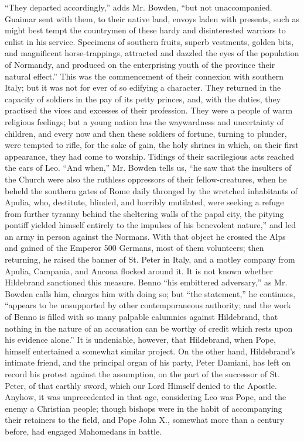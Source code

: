 ``They departed accordingly,'' adds Mr. Bowden, ``but
not unaccompanied. Guaimar sent with them, to their native land,
envoys laden with presents, such as might best tempt the countrymen of
these hardy and disinterested warriors to enlist in his service.
Specimens of southern fruits, superb vestments, golden bits, and
magnificent horse-trappings, attracted and dazzled the eyes of the
population of Normandy, and produced on the enterprising youth of the
province their natural effect.'' This was the commencement of their
connexion with southern Italy; but it was not for ever of so edifying
a character. They returned in the capacity of soldiers in the
pay of its petty princes, and, with the duties, they practised the
vices and excesses of their profession. They were a people of warm
religious feelings; but a young nation has the waywardness and
uncertainty of children, and every now and then these soldiers of
fortune, turning to plunder, were tempted to rifle, for the sake of
gain, the holy shrines in which, on their first appearance, they had
come to worship. Tidings of their sacrilegious acts reached the ears
of Leo. ``And when,'' Mr. Bowden tells us, ``he saw that the insulters of
the Church were also the ruthless oppressors of their
fellow-creatures, when he beheld the southern gates of Rome daily
thronged by the wretched inhabitants of Apulia, who, destitute,
blinded, and horribly mutilated, were seeking a refuge from further
tyranny behind the sheltering walls of the papal city, the pitying
pontiff yielded himself entirely to the impulses of his benevolent
nature,'' and led an army in person against the Normans. With that
object he crossed the Alps and gained of the Emperor 500 Germans, most
of them volunteers; then returning, he raised the banner of St. Peter
in Italy, and a motley company from Apulia, Campania, and Ancona
flocked around it. It is not known whether Hildebrand sanctioned this
measure. Benno ``his embittered adversary,'' as Mr. Bowden calls him,
charges him with doing so; but ``the statement,'' he continues, ``appears
to be unsupported by other contemporaneous authority; and the work of
Benno is filled with so many palpable calumnies against Hildebrand,
that nothing in the nature of an accusation can be worthy of credit
which rests upon his evidence alone.'' It is undeniable, however, that
Hildebrand, when Pope, himself entertained a somewhat similar project.
On the other hand, Hildebrand's intimate friend, and the
principal organ of his party, Peter Damiani, has left on record his
protest against the assumption, on the part of the successor of St.
Peter, of that earthly sword, which our Lord Himself denied to the
Apostle. Anyhow, it was unprecedented in that age, considering Leo was
Pope, and the enemy a Christian people; though bishops were in the
habit of accompanying their retainers to the field, and Pope John X.,
somewhat more than a century before, had engaged Mahomedans in battle.

